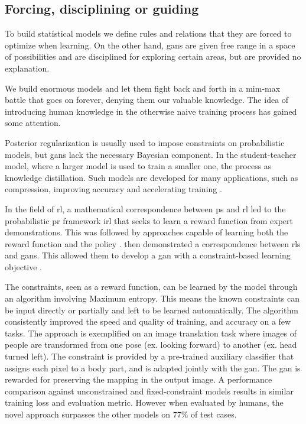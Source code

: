 %
%

\subsection{Forcing, disciplining or guiding \label{sec:knowledge}}

To build statistical models we define rules and relations that they are forced to optimize when learning. On the other hand, \glspl{gan} are given free range in a space of possibilities and are disciplined for exploring certain areas, but are provided no explanation. \par

We build enormous models and let them fight back and forth in a mim-max battle that goes on forever, denying them our valuable knowledge. The idea of introducing human knowledge in the otherwise naive training process has gained some attention.\par

Posterior regularization is usually used to impose constraints on probabilistic models, but \glspl{gan} lack the necessary Bayesian component. In the student-teacher model, where a larger model is used to train a smaller one, the process as knowledge distillation. Such models are developed for many applications, such as compression, improving accuracy and accelerating training \cite{abbasi2019odeling}.

In the field of \gls{rl}, a mathematical correspondence between \gls{ps} and \gls{rl} led to the probabilistic \gls{pr} framework \gls{irl} that seeks to learn a reward function from expert demonstrations. This was followed by approaches capable of learning both the reward function and the policy \cite{finn2016guided,fu2018learning}. \citeauthor{Hu2018} then demonstrated a correspondence between \glspl{rl} and \glspl{gan}. This allowed them to develop a \gls{gan} with a constraint-based learning objective \cite{Hu2018}.\par

The constraints, seen as a reward function, can be learned by the model through an algorithm involving Maximum entropy. This means the known constraints can be input directly or partially and left to be learned automatically. The algorithm consistently improved the speed and quality of training, and accuracy on a few tasks. The approach is exemplified on an image translation task where images of people are transformed from one pose (ex. looking forward) to another (ex. head turned left). The constraint is provided by a pre-trained auxiliary classifier that assigns each pixel to a body part, and is adapted jointly with the \gls{gan}. The \gls{gan} is rewarded for preserving the mapping in the output image. A performance comparison against unconstrained and fixed-constraint models results in similar training loss and evaluation metric. However when evaluated by humans, the novel approach surpasses the other models on 77\% of test cases. \par

